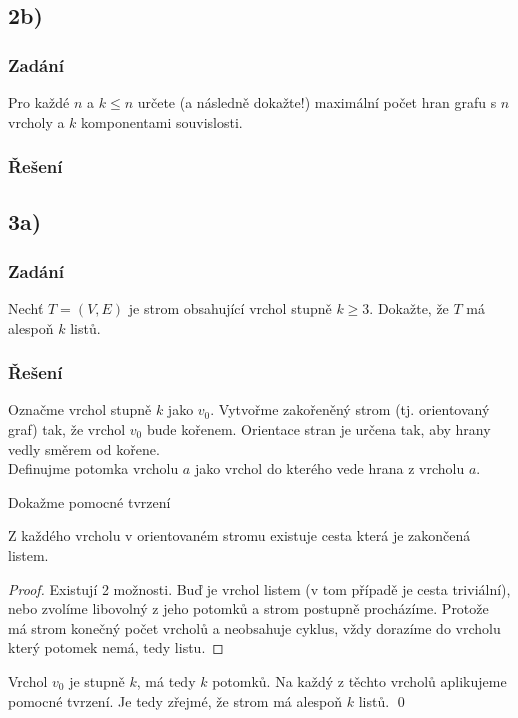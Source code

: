 \documentclass[../main.tex]{subfiles}
\begin{document}
\subsection{2b)}
\subsubsection*{Zadání}
Pro každé $n$ a $k\leq n$ určete (a následně dokažte!) maximální počet hran grafu
s $n$ vrcholy a $k$ komponentami souvislosti.


\subsubsection*{Řešení}

\subsection{3a)}
\subsubsection*{Zadání}
Nechť $T=(V,E)$ je strom obsahující vrchol stupně $k\geq 3$.
Dokažte, že $T$ má alespoň $k$ listů.
\subsubsection*{Řešení}

Označme vrchol stupně $k$ jako $v_0$. Vytvořme zakořeněný strom (tj. orientovaný graf) tak, že vrchol $v_0$ bude kořenem. 
Orientace stran je určena tak, aby hrany vedly směrem od kořene. \\
Definujme potomka vrcholu $a$ jako vrchol do kterého vede hrana z vrcholu $a$.

Dokažme pomocné tvrzení
\begin{lemma*}
    Z každého vrcholu v orientovaném stromu existuje cesta která je zakončená listem.
\end{lemma*}
\begin{proof}
    Existují 2 možnosti. Buď je vrchol listem (v tom případě je cesta triviální), 
    nebo zvolíme libovolný z jeho potomků a strom postupně procházíme.
    Protože má strom konečný počet vrcholů a neobsahuje cyklus, 
    vždy dorazíme do vrcholu který potomek nemá, tedy listu. 
\end{proof}

Vrchol $v_0$ je stupně $k$, má tedy $k$ potomků. Na každý z těchto vrcholů aplikujeme pomocné tvrzení.
Je tedy zřejmé, že strom má alespoň $k$ listů. \qed
\end{document}
